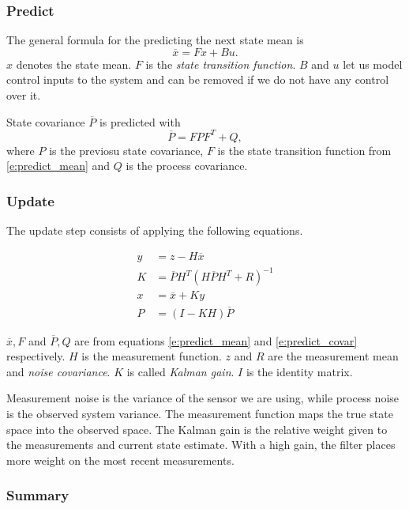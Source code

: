 \subsubsection*{Predict}

The general formula for the predicting the next state mean is
\begin{equation}\label{e:predict_mean}
    \overline{x} = Fx + Bu.
\end{equation}
$x$ denotes the state mean. $F$ is the \textit{state transition function}. $B$ and $u$ let us model control inputs to the system and can be removed if we do not have any control over it.

State covariance $\overline{P}$ is predicted with
\begin{equation}\label{e:predict_covar}
    \overline{P} = FPF^T + Q,
\end{equation}
where $P$ is the previosu state covariance, $F$ is the state transition function from \autoref{e:predict_mean} and $Q$ is the process covariance.

\subsubsection*{Update}

The update step consists of applying the following equations.

\begin{align}
    y &= z - H\overline{x} \\
    K &= \overline{P}H^T(H\overline{P}H^T + R)^{-1} \\
    x &= \overline{x} + Ky \\
    P &= (I - KH)\overline{P}
\end{align}

$\overline{x}, F$ and $\overline{P}, Q$ are from equations \ref{e:predict_mean} and \ref{e:predict_covar} respectively. $H$ is the measurement function. $z$ and $R$ are the measurement mean and \textit{noise covariance}. $K$ is called \textit{Kalman gain}. $I$ is the identity matrix.

Measurement noise is the variance of the sensor we are using, while process noise is the observed system variance. The measurement function maps the true state space into the observed space. 
The Kalman gain is the relative weight given to the measurements and current state estimate. With a high gain, the filter places more weight on the most recent measurements.


\subsubsection*{Summary}

